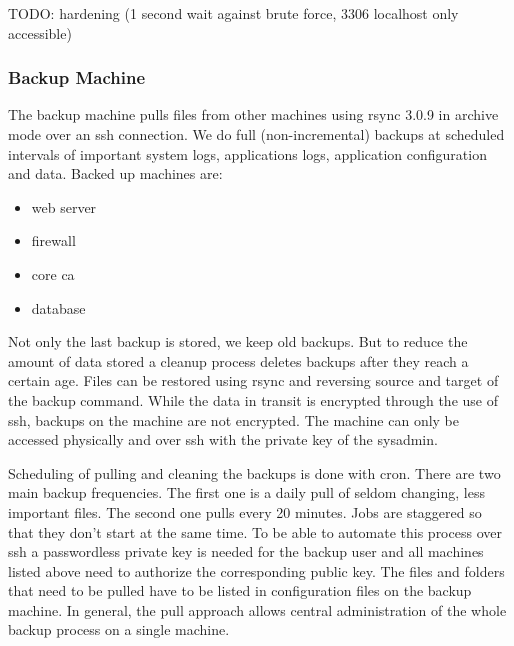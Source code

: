 \documentclass[english]{article}
\begin{document}
TODO: hardening (1 second wait against brute force, 3306 localhost only accessible)

\subsubsection{Backup Machine}

The backup machine pulls files from other machines using rsync 3.0.9 in archive mode over an ssh connection. We do full (non-incremental) backups at scheduled intervals of important system logs, applications logs, application configuration and data. Backed up machines are:

\begin{itemize}
    \item web server
    \item firewall
    \item core ca
    \item database
\end{itemize}

Not only the last backup is stored, we keep old backups. But to reduce the amount of data stored a cleanup process deletes backups after they reach a certain age. Files can be restored using rsync and reversing source and target of the backup command. 
While the data in transit is encrypted through the use of ssh, backups on the machine are not encrypted. The machine can only be accessed physically and over ssh with the private key of the sysadmin.

Scheduling of pulling and cleaning the backups is done with cron. There are two main backup frequencies. The first one is a daily pull of seldom changing, less important files. The second one pulls every 20 minutes. Jobs are staggered so that they don't start at the same time. To be able to automate this process over ssh a passwordless private key is needed for the backup user and all machines listed above need to authorize the corresponding public key.
The files and folders that need to be pulled have to be listed in configuration files on the backup machine. In general, the pull approach allows central administration of the whole backup process on a single machine.
\end{document}
